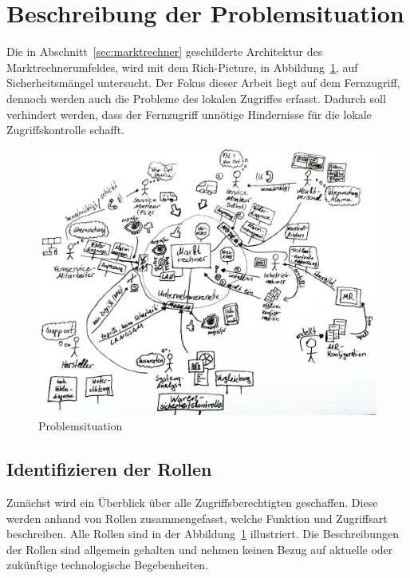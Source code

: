 \documentclass[11pt,a4paper]{report}
\begin{document}
\section{Beschreibung der Problemsituation} \label{sec:problem_situation}

Die in Abschnitt~\ref{sec:marktrechner} geschilderte Architektur des Marktrechnerumfeldes, wird mit dem Rich-Picture, in Abbildung~\ref{fig:problem_situation}, auf Sicherheitsmängel untersucht. Der Fokus dieser Arbeit liegt auf dem Fernzugriff, dennoch werden auch die Probleme des lokalen Zugriffes erfasst. Dadurch soll verhindert werden, dass der Fernzugriff unnötige Hindernisse für die lokale Zugriffskontrolle schafft. 

\begin{figure}[htb]
\centering
\includegraphics[scale=0.215]{images/problemsituation.jpg}
\caption{Problemsituation}
\label{fig:problem_situation}
\end{figure}

\subsection{Identifizieren der Rollen} \label{sec:roles}

Zunächst wird ein Überblick über alle Zugriffsberechtigten geschaffen. Diese werden anhand von Rollen zusammengefasst, welche Funktion und Zugriffsart beschreiben. Alle Rollen sind in der Abbildung~\ref{fig:problem_situation} illustriert. Die Beschreibungen der Rollen sind allgemein gehalten und nehmen keinen Bezug auf aktuelle oder zukünftige technologische Begebenheiten.
\end{document}
